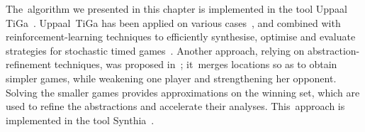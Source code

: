 The~algorithm we presented in this chapter is implemented in the tool
Uppaal TiGa~\cite{BCD+07}. Uppaal~TiGa has been applied on various
cases~\cite{CJLRR09,Sor14}, and combined with
reinforcement-learning techniques to efficiently synthesise, optimise
and evaluate strategies for stochastic timed games~\cite{DJLMT15}.
%
Another approach, relying on
abstraction-refinement techniques, was proposed in~\cite{EMP10};
it~merges locations so as to obtain simpler games, while weakening one
player and strengthening her opponent. Solving the smaller games
provides approximations on the winning set, which are used to refine
the abstractions and accelerate their analyses. This~approach is
implemented in the tool Synthia~\cite{PEM11}.




  




